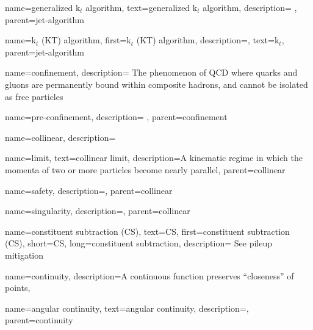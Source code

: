     {
        name=generalized k\(_t\) algorithm,
        text={generalized k\(_t\) algorithm},
        description={
        },
        parent=jet-algorithm
    }


    {
        name=k\(_t\) (KT) algorithm,
        first={k\(_t\) (KT) algorithm},
        description={},
        text={k\(_t\)},
        parent=jet-algorithm
    }



{
    name=confinement,
    description={
        The phenomenon of QCD where quarks and gluons are permanently bound within composite hadrons, and cannot be isolated as free particles
    }
}

    {
        name=pre-confinement,
        description={
        },
        parent=confinement
    }




{
    name=collinear,
    description={}
}

    {
        name=limit,
        text=collinear limit,
        description={A kinematic regime in which the momenta of two or more particles become nearly parallel},
        parent=collinear
    }


    {
        name=safety,
        description={},
        parent=collinear
    }

    {
        name=singularity,
        description={},
        parent=collinear
    }



{
    name=constituent subtraction (CS),
    text=CS,
    first=constituent subtraction (CS),
    short=CS,
    long=constituent subtraction,
    description={
        See pileup mitigation
    }
}


{
  name=continuity,
  description={A continuous function preserves ``closeness'' of points},
}

    {
        name=angular continuity,
        text=angular continuity,
        description={},
        parent=continuity
    }


